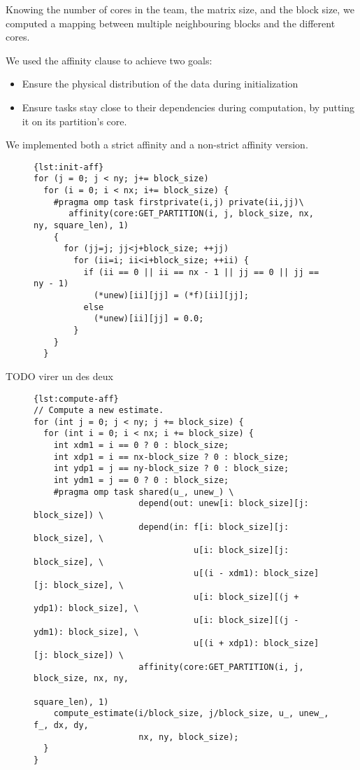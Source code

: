 \documentclass{Styles/llncs}
\begin{document}
Knowing the number of cores in the team, the matrix size, and the block size, we computed a mapping
between multiple neighbouring blocks and the different cores.

We used the affinity clause to achieve two goals:
\begin{itemize}
    \item Ensure the physical distribution of the data during initialization
    \item Ensure tasks stay close to their dependencies during computation, by putting it on its partition's core.
\end{itemize}

We implemented both a strict affinity and a non-strict affinity version.


\begin{figure}[htbp]
\begin{lstlisting}[caption=Usage example of the affinity clause for initialization,frame=tlrb,style=smaller,label=lst:init-aff]{lst:init-aff}
for (j = 0; j < ny; j+= block_size)
  for (i = 0; i < nx; i+= block_size) {
    #pragma omp task firstprivate(i,j) private(ii,jj)\
       affinity(core:GET_PARTITION(i, j, block_size, nx, ny, square_len), 1)
    {
      for (jj=j; jj<j+block_size; ++jj)
        for (ii=i; ii<i+block_size; ++ii) {
          if (ii == 0 || ii == nx - 1 || jj == 0 || jj == ny - 1)
            (*unew)[ii][jj] = (*f)[ii][jj];
          else
            (*unew)[ii][jj] = 0.0;
        }
    }
  }
\end{lstlisting}
\end{figure}

TODO virer un des deux

\begin{figure}[htbp]
\begin{lstlisting}[caption=Usage example of the affinity clause for computation,frame=tlrb,style=smaller,label=lst:compute-aff]{lst:compute-aff}
// Compute a new estimate.
for (int j = 0; j < ny; j += block_size) {
  for (int i = 0; i < nx; i += block_size) {
    int xdm1 = i == 0 ? 0 : block_size;
    int xdp1 = i == nx-block_size ? 0 : block_size;
    int ydp1 = j == ny-block_size ? 0 : block_size;
    int ydm1 = j == 0 ? 0 : block_size;
    #pragma omp task shared(u_, unew_) \
                     depend(out: unew[i: block_size][j: block_size]) \
                     depend(in: f[i: block_size][j: block_size], \
                                u[i: block_size][j: block_size], \
                                u[(i - xdm1): block_size][j: block_size], \
                                u[i: block_size][(j + ydp1): block_size], \
                                u[i: block_size][(j - ydm1): block_size], \
                                u[(i + xdp1): block_size][j: block_size]) \
                     affinity(core:GET_PARTITION(i, j, block_size, nx, ny,
                                                 square_len), 1)
    compute_estimate(i/block_size, j/block_size, u_, unew_, f_, dx, dy,
                     nx, ny, block_size);
  }
}
\end{lstlisting}
\end{figure}
\end{document}

